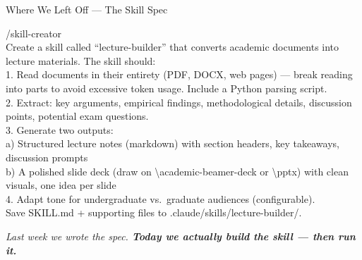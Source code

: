 \documentclass[aspectratio=169, 10pt]{beamer}
\begin{document}
\begin{frame}[fragile]{Where We Left Off --- The Skill Spec}
\begin{tcolorbox}[promptboxsm]
{\color{CoolGray}\fontsize{6}{7.5}\selectfont\ttfamily /skill-creator\\[2pt]
\color{white}\fontsize{6}{7.5}\selectfont\ttfamily
Create a skill called ``lecture-builder'' that converts academic documents into lecture materials. The skill should:\\[1pt]
1. Read documents in their entirety (PDF, DOCX, web pages) --- break reading into parts to avoid excessive token usage. Include a Python parsing script.\\[1pt]
2. Extract: key arguments, empirical findings, methodological details, discussion points, potential exam questions.\\[1pt]
3. Generate two outputs:\\
\quad a) Structured lecture notes (markdown) with section headers, key takeaways, discussion prompts\\
\quad b) A polished slide deck (draw on \textbackslash academic-beamer-deck or \textbackslash pptx) with clean visuals, one idea per slide\\[1pt]
4. Adapt tone for undergraduate vs.\ graduate audiences (configurable).\\[1pt]
Save SKILL.md + supporting files to .claude/skills/lecture-builder/.
}
\end{tcolorbox}
\vskip3pt
\begin{center}
{\scriptsize\color{CoolGray}\textit{Last week we wrote the spec. \textbf{\color{DeepCharcoal}Today we actually build the skill --- then run it.}}}
\end{center}
\end{frame}
\end{document}
